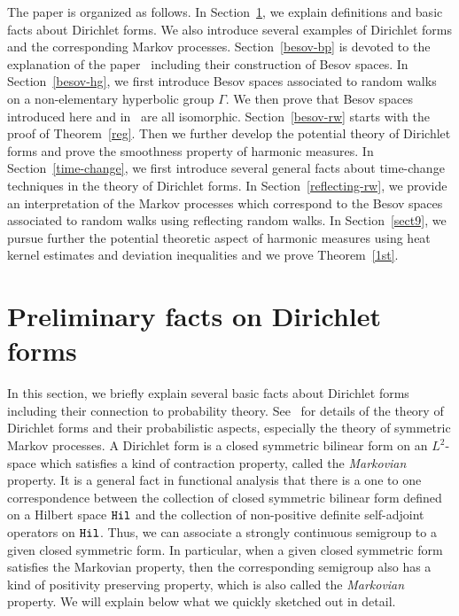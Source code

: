 \documentclass[10pt]{amsart}
\theoremstyle{definition}\newtheorem{defi}[theo]{Definition}\newtheorem{rema}[theo]{Remark}\newtheorem{exam}[theo]{Example}\newtheorem{exem}[theo]{Example}\newtheorem{nota}[theo]{Notation}
\begin{document}
The paper is organized as follows. In Section~\ref{pre-df}, we explain definitions and basic facts about Dirichlet forms. We also introduce several examples of Dirichlet forms and the corresponding Markov processes. Section~\ref{besov-bp} is devoted to the explanation of the paper~\cite{BP} including their construction of Besov spaces. In Section~\ref{besov-hg}, we first introduce Besov spaces associated to random walks on a non-elementary hyperbolic group $\Gamma$. We then prove that Besov spaces introduced here and in~\cite{BP} are all isomorphic. Section~\ref{besov-rw} starts with the proof of Theorem~\ref{reg}. Then we further develop the potential theory of Dirichlet forms and prove the smoothness property of harmonic measures. In Section~\ref{time-change}, we first introduce several general facts about time-change techniques in the theory of Dirichlet forms. In Section~\ref{reflecting-rw}, we provide an interpretation of the Markov processes which correspond to the Besov spaces associated to random walks using reflecting random walks. In Section~\ref{sect9}, we pursue further the potential theoretic aspect of harmonic measures using heat kernel estimates and deviation inequalities and we prove Theorem~\ref{1st}.



\section{Preliminary facts on Dirichlet forms}\label{pre-df}
In this section, we briefly explain several basic facts about Dirichlet forms including their connection to probability theory. See~\cite{CF,FOT} for details of the theory of Dirichlet forms and their probabilistic aspects, especially the theory of symmetric Markov processes. A Dirichlet form is a closed symmetric bilinear form on an $L^2$-space which satisfies a kind of contraction property, called the \emph{Markovian} property. It is a general fact in functional analysis that there is a one to one correspondence between the collection of closed symmetric bilinear form defined on a Hilbert space ${\tt Hil}$ and the collection of non-positive definite self-adjoint operators on ${\tt Hil}$. Thus, we can associate a strongly continuous semigroup to a given closed symmetric form. In particular, when a given closed symmetric form satisfies the Markovian property, then the corresponding semigroup also has a kind of positivity preserving property, which is also called the \emph{Markovian} property. We will explain below what we quickly sketched out in detail.
\end{document}
